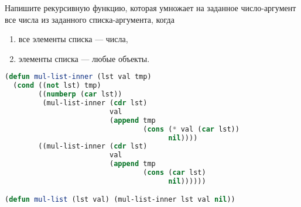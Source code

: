 Напишите рекурсивную функцию, которая умножает на заданное число-аргумент все
числа из заданного списка-аргумента, когда

\begin{enumerate}
    \item все элементы списка --- числа,
    \item элементы списка --- любые объекты.
\end{enumerate}

\begin{lstlisting}[language=Lisp]
(defun mul-list-inner (lst val tmp)
  (cond ((not lst) tmp)
        ((numberp (car lst))
         (mul-list-inner (cdr lst)
                         val
                         (append tmp
                                 (cons (* val (car lst))
                                       nil))))
        ((mul-list-inner (cdr lst)
                         val
                         (append tmp
                                 (cons (car lst)
                                       nil))))))

(defun mul-list (lst val) (mul-list-inner lst val nil))
\end{lstlisting}

